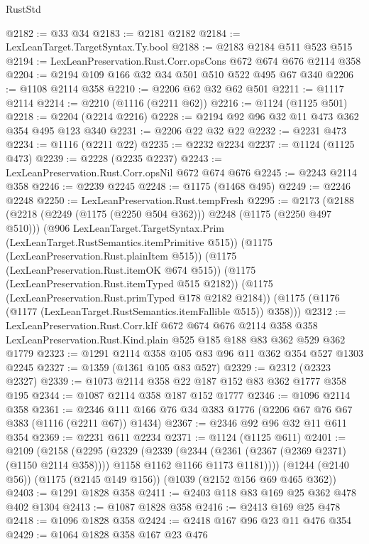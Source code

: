 \begin{lexlean}{RustStd}
\begin{coremodule}
@2182 := @33 @34
@2183 := @2181 @2182
@2184 := LexLeanTarget.TargetSyntax.Ty.bool
@2188 := @2183 @2184 @511 @523 @515
@2194 := LexLeanPreservation.Rust.Corr.opsCons @672 @674 @676 @2114 @358
@2204 := @2194 @109 @166 @32 @34 @501 @510 @522 @495 @67 @340
@2206 := @1108 @2114 @358
@2210 := @2206 @62 @32 @62 @501
@2211 := @1117 @2114
@2214 := @2210 (@1116 (@2211 @62))
@2216 := @1124 (@1125 @501)
@2218 := @2204 (@2214 @2216)
@2228 := @2194 @92 @96 @32 @11 @473 @362 @354 @495 @123 @340
@2231 := @2206 @22 @32 @22
@2232 := @2231 @473
@2234 := @1116 (@2211 @22)
@2235 := @2232 @2234
@2237 := @1124 (@1125 @473)
@2239 := @2228 (@2235 @2237)
@2243 := LexLeanPreservation.Rust.Corr.opsNil @672 @674 @676
@2245 := @2243 @2114 @358
@2246 := @2239 @2245
@2248 := @1175 (@1468 @495)
@2249 := @2246 @2248
@2250 := LexLeanPreservation.Rust.tempFresh
@2295 := @2173
    (@2188
      (@2218 (@2249 (@1175 (@2250 @504 @362))) @2248 (@1175 (@2250 @497 @510)))
      (@906 LexLeanTarget.TargetSyntax.Prim (LexLeanTarget.RustSemantics.itemPrimitive @515))
      (@1175 (LexLeanPreservation.Rust.plainItem @515))
      (@1175 (LexLeanPreservation.Rust.itemOK @674 @515))
      (@1175 (LexLeanPreservation.Rust.itemTyped @515 @2182))
      (@1175 (LexLeanPreservation.Rust.primTyped @178 @2182 @2184))
      (@1175 (@1176 (@1177 (LexLeanTarget.RustSemantics.itemFallible @515)) @358)))
@2312 := LexLeanPreservation.Rust.Corr.kIf
    @672
    @674
    @676
    @2114
    @358
    @358
    LexLeanPreservation.Rust.Kind.plain
    @525
    @185
    @188
    @83
    @362
    @529
    @362
    @1779
@2323 := @1291 @2114 @358 @105 @83 @96 @11 @362 @354 @527 @1303 @2245
@2327 := @1359 (@1361 @105 @83 @527)
@2329 := @2312 (@2323 @2327)
@2339 := @1073 @2114 @358 @22 @187 @152 @83 @362 @1777 @358 @195
@2344 := @1087 @2114 @358 @187 @152 @1777
@2346 := @1096 @2114 @358
@2361 := @2346 @111 @166 @76 @34 @383 @1776 (@2206 @67 @76 @67 @383 (@1116 (@2211 @67)) @1434)
@2367 := @2346 @92 @96 @32 @11 @611 @354
@2369 := @2231 @611 @2234
@2371 := @1124 (@1125 @611)
@2401 := @2109
    (@2158
      (@2295
        (@2329
          (@2339
            (@2344 (@2361 (@2367 (@2369 @2371) (@1150 @2114 @358))))
            @1158
            @1162
            @1166
            @1173
            @1181))))
    (@1244 (@2140 @56))
    (@1175 (@2145 @149 @156))
    (@1039 (@2152 @156 @69 @465 @362))
@2403 := @1291 @1828 @358
@2411 := @2403 @118 @83 @169 @25 @362 @478 @402 @1304
@2413 := @1087 @1828 @358
@2416 := @2413 @169 @25 @478
@2418 := @1096 @1828 @358
@2424 := @2418 @167 @96 @23 @11 @476 @354
@2429 := @1064 @1828 @358 @167 @23 @476

\end{coremodule}
\end{lexlean}
